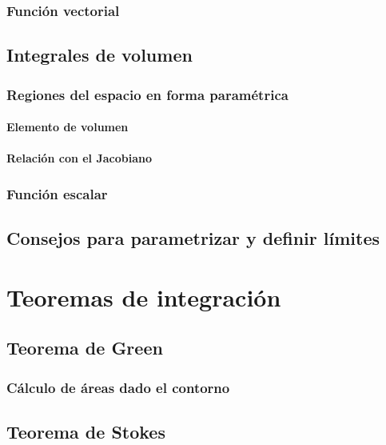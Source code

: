 \documentclass[12pt, fleqn]{report}                             %
\begin{document}
            \subsection{Función vectorial}
        
        \section{Integrales de volumen}
        
            \subsection{Regiones del espacio en forma paramétrica}
            
                \subsubsection{Elemento de volumen}
                
                \subsubsection{Relación con el Jacobiano}
        
            \subsection{Función escalar}
            
        \section{Consejos para parametrizar y definir límites}
    
    \chapter{Teoremas de integración}
    
        \section{Teorema de Green}
        
            \subsection{Cálculo de áreas dado el contorno}
        
        \section{Teorema de Stokes}
        
\end{document}
